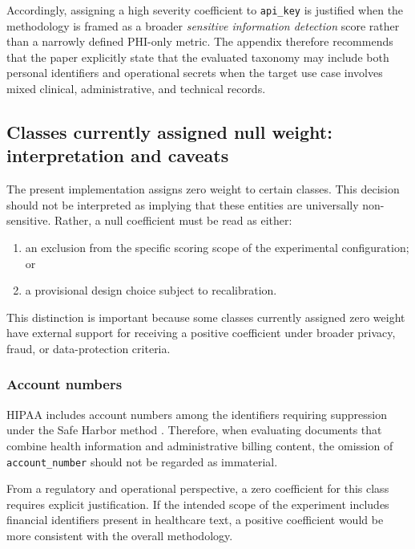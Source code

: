 \documentclass[11pt,a4paper]{article}
\begin{document}
Accordingly, assigning a high severity coefficient to \texttt{api\_key} is justified when the methodology is framed as a broader \textit{sensitive information detection} score rather than a narrowly defined PHI-only metric. The appendix therefore recommends that the paper explicitly state that the evaluated taxonomy may include both personal identifiers and operational secrets when the target use case involves mixed clinical, administrative, and technical records.

\subsection{Classes currently assigned null weight: interpretation and caveats}

The present implementation assigns zero weight to certain classes. This decision should not be interpreted as implying that these entities are universally non-sensitive. Rather, a null coefficient must be read as either:

\begin{enumerate}
    \item an exclusion from the specific scoring scope of the experimental configuration; or
    \item a provisional design choice subject to recalibration.
\end{enumerate}

This distinction is important because some classes currently assigned zero weight have external support for receiving a positive coefficient under broader privacy, fraud, or data-protection criteria.

\subsubsection{Account numbers}

HIPAA includes account numbers among the identifiers requiring suppression under the Safe Harbor method \citep{hhs_hipaa_deidentification}. Therefore, when evaluating documents that combine health information and administrative billing content, the omission of \texttt{account\_number} should not be regarded as immaterial.

From a regulatory and operational perspective, a zero coefficient for this class requires explicit justification. If the intended scope of the experiment includes financial identifiers present in healthcare text, a positive coefficient would be more consistent with the overall methodology.
\end{document}
